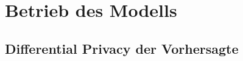 \section{Betrieb des Modells}\label{sec:betrieb}
\subsection{Differential Privacy der Vorhersagte}\label{sec:dp_output}
